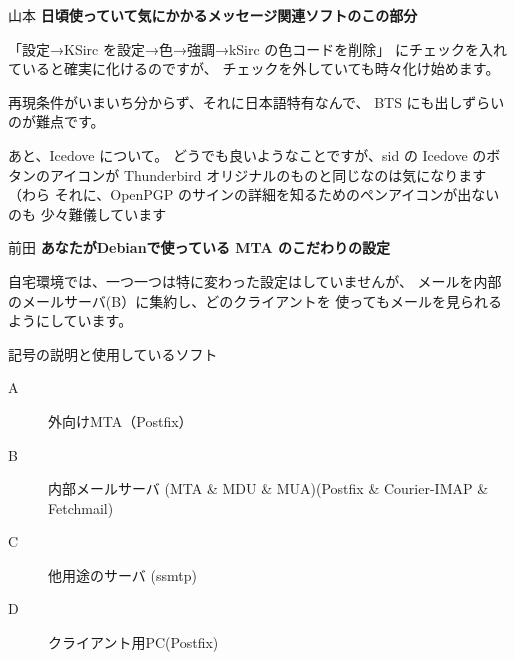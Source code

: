 \documentclass[cjk,dvipdfmx,12pt]{beamer}
\newenvironment{commandline}%
{\VerbatimEnvironment
  \begin{Sbox}\begin{minipage}{0.9\hsize}\begin{fontsize}{7.3}{7.3} \begin{BVerbatim}}%
{\end{BVerbatim}\end{fontsize}\end{minipage}\end{Sbox}
  \setlength{\fboxsep}{8pt}

\vspace{6pt}%
\fcolorbox{dancerdarkblue}{dancerlightblue}{\TheSbox}

\vspace{6pt}%
}
\begin{document}

\begin{frame}[containsverbatim]{山本}
\textbf{日頃使っていて気にかかるメッセージ関連ソフトのこの部分}

「設定→KSirc を設定→色→強調→kSirc の色コードを削除」
にチェックを入れていると確実に化けるのですが、
チェックを外していても時々化け始めます。

再現条件がいまいち分からず、それに日本語特有なんで、
BTS にも出しずらいのが難点です。

あと、Icedove について。
どうでも良いようなことですが、sid の Icedove のボタンのアイコンが
Thunderbird オリジナルのものと同じなのは気になります（わら
それに、OpenPGP のサインの詳細を知るためのペンアイコンが出ないのも
少々難儀しています
\end{frame}

\begin{frame}{前田}
\textbf{あなたがDebianで使っている MTA のこだわりの設定}

自宅環境では、一つ一つは特に変わった設定はしていませんが、
メールを内部のメールサーバ(B）に集約し、どのクライアントを
使ってもメールを見られるようにしています。

記号の説明と使用しているソフト
\begin{description}
\item[A] 外向けMTA（Postfix）
\item[B] 内部メールサーバ
	(MTA \& MDU \& MUA)(Postfix \& Courier-IMAP \& Fetchmail)
\item[C] 他用途のサーバ (ssmtp)
\item[D] クライアント用PC(Postfix)
\end{description}

\end{frame}
\end{document}
